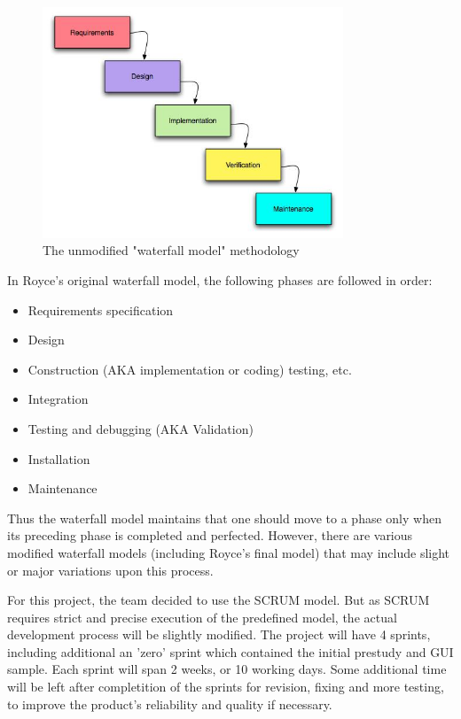 \begin{figure}[htb]
	\centering
	\includegraphics[width=0.8\textwidth]{organizational/development_process/waterfall.jpg}
	\caption{The unmodified "waterfall model" methodology\cite{worldpress:waterfall}}
	\label{fig:waterfall-model}
\end{figure}

In Royce's original waterfall model, the following phases are followed in order:

\begin{itemize}
	\item Requirements specification
	\item Design
	\item Construction (AKA implementation or coding) testing, etc.
	\item Integration
	\item Testing and debugging (AKA Validation)
	\item Installation
	\item Maintenance
\end{itemize}

Thus the waterfall model maintains that one should move to a phase only when its preceding phase is 
completed and perfected. However, there are various modified waterfall models (including Royce's final model) 
that may include slight or major variations upon this process.\newline\newline
	
For this project, the team decided to use the SCRUM model. But as SCRUM requires strict and precise
execution of the predefined model, the actual development process will be slightly modified. 
The project will have 4 sprints, including additional an 'zero' sprint which contained the initial
prestudy and GUI sample. Each sprint will span 2 weeks, or 10 working days. 
Some additional time will be left after completition of the sprints for revision, 
fixing and more testing, to improve the product's reliability and quality if necessary.
